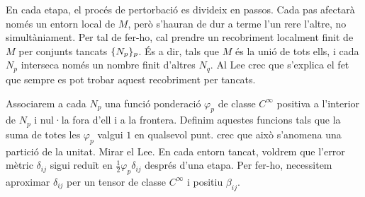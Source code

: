 En cada etapa, el procés de pertorbació es divideix en passos. Cada pas afectarà només un entorn local de $M$, però s'hauran de dur a terme l'un rere l'altre, no simultàniament. Per tal de fer-ho, cal prendre un recobriment localment finit de $M$ per conjunts tancats $\{N_p\}_p$. És a dir, tals que $M$ és la unió de tots ells, i cada $N_p$ interseca només un nombre finit d'altres $N_q$. {\color{blue}  Al Lee crec que s'explica el fet que sempre es pot trobar aquest recobriment per tancats.}

Associarem a cada $N_p$ una funció ponderació $\varphi_p$ de classe $C^\infty$ positiva a l'interior de $N_p$ i nul·la fora d'ell i a la frontera. Definim aquestes funcions tals que la suma de totes les $\varphi_p$ valgui $1$ en qualsevol punt. {\color{blue} crec que això s'anomena una partició de la unitat. Mirar el Lee. } En cada entorn tancat, voldrem que l'error mètric $\delta_{ij}$ sigui reduït en $\frac12\varphi_p\delta_{ij}$ després d'una etapa. Per fer-ho, necessitem aproximar $\delta_{ij}$ per un tensor de classe $C^\infty$ i positiu $\beta_{ij}$.

